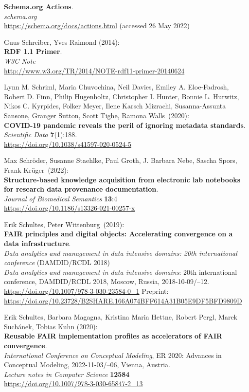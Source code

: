 \begin{thebibliography}{9}
\textbf{Schema.org {Actions}}.\\
\emph{schema.org}\\
\url{https://schema.org/docs/actions.html} (accessed 26 May 2022)

Guus Schreiber, Yves Raimond (2014):\\
\textbf{RDF 1.1 Primer}. \\
\emph{W3C Note} \\
\url{http://www.w3.org/TR/2014/NOTE-rdf11-primer-20140624}

Lynn M. Schriml, Maria Chuvochina, Neil Davies, Emiley A.
Eloe-Fadrosh, Robert D. Finn, Philip Hugenholtz, Christopher I. Hunter,
Bonnie L. Hurwitz, Nikos C. Kyrpides, Folker Meyer, Ilene Karsch
Mizrachi, Susanna-Assunta Sansone, Granger Sutton, Scott Tighe, Ramona
Walls~(2020):\\
\textbf{COVID-19 pandemic reveals the peril of ignoring metadata
standards}.\\
\emph{Scientific Data} \textbf{7}(1):188.\\
\url{https://doi.org/10.1038/s41597-020-0524-5}

 Max Schröder, Susanne Staehlke, Paul Groth, J.
 Barbara Nebe, Sascha Spors, Frank Krüger~(2022):\\
\textbf{Structure-based knowledge acquisition from electronic lab
notebooks for research data provenance documentation}.\\
\emph{Journal of Biomedical Semantics} \textbf{13}:4\\
\url{https://doi.org/10.1186/s13326-021-00257-x}

Erik Schultes, Peter Wittenburg~(2019):\\
\textbf{FAIR principles and digital objects: Accelerating convergence on a data infrastructure}.\\
\emph{Data analytics and management in data intensive domains: 20th
international conference} (DAMDID/RCDL 2018)\\
\emph{Data analytics and management in data intensive domains}: 20th international conference,
{DAMDID}/{RCDL} 2018, Moscow, Russia, 2018-10-09/--12. \\
\url{https://doi.org/10.1007/978-3-030-23584-0_1}
Preprint: \url{https://doi.org/10.23728/B2SHARE.166A074BFF614A31B05E9DF5BFD9809D}

Erik Schultes, Barbara Magagna, Kristina Maria Hettne, Robert Pergl,
Marek Suchánek, Tobias Kuhn (2020): \\
\textbf{Reusable {FAIR} implementation profiles as accelerators of {FAIR} convergence}.\\
\emph{International Conference on Conceptual Modeling}, ER 2020: Advances in Conceptual Modeling, 2022-11-03/--06, Vienna, Austria. \\
\emph{Lecture notes in Computer Science} \textbf{12584} \\ 
\url{https://doi.org/10.1007/978-3-030-65847-2_13}


\end{thebibliography}
